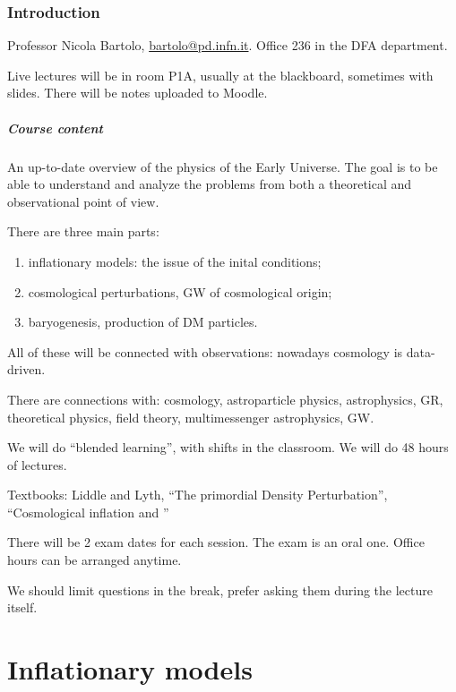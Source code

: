 \documentclass[main.tex]{subfiles}
\begin{document}

\subsection*{Introduction}

Professor Nicola Bartolo, \url{bartolo@pd.infn.it}. 
Office 236 in the DFA department.

Live lectures will be in room P1A, usually at the blackboard, sometimes with slides.
There will be notes uploaded to Moodle.

\paragraph{Course content}

An up-to-date overview of the physics of the Early Universe.
The goal is to be able to understand and analyze the problems from both a theoretical and observational point of view. 

There are three main parts: 
\begin{enumerate}
    \item inflationary models: the issue of the inital conditions;
    \item cosmological perturbations, GW of cosmological origin;
    \item baryogenesis, production of DM particles.
\end{enumerate}

All of these will be connected with observations: nowadays cosmology is data-driven. 

There are connections with: cosmology, astroparticle physics, astrophysics, GR, theoretical physics, field theory, multimessenger astrophysics, GW. 

We will do ``blended learning'', with shifts in the classroom. 
We will do 48 hours of lectures. 

Textbooks: Liddle and Lyth, ``The primordial Density Perturbation'', ``Cosmological inflation and ''

There will be 2 exam dates for each session. The exam is an oral one. 
Office hours can be arranged anytime. 

We should limit questions in the break, prefer asking them during the lecture itself.

\chapter{Inflationary models}
\end{document}
